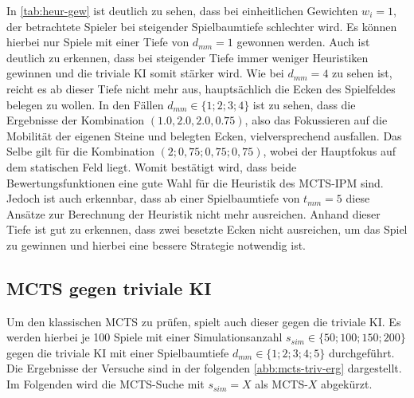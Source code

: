 \documentclass[12pt,a4paper,bibliography=totocnumbered,listof=totocnumbered]{article}
\begin{document}
In \autoref{tab:heur-gew} ist deutlich zu sehen, dass bei einheitlichen Gewichten $w_i=1$, der betrachtete Spieler bei steigender Spielbaumtiefe schlechter wird. Es können hierbei nur Spiele mit einer Tiefe von $d_{mm}=1$ gewonnen werden. Auch ist deutlich zu erkennen, dass bei steigender Tiefe immer weniger Heuristiken gewinnen und die triviale KI somit stärker wird. Wie bei $d_{mm}=4$ zu sehen ist, reicht es ab dieser Tiefe nicht mehr aus, hauptsächlich die Ecken des Spielfeldes belegen zu wollen. In den Fällen $d_{mm} \in \{1;2;3;4\}$ ist zu sehen, dass die Ergebnisse der Kombination $(1.0, 2.0, 2.0, 0.75)$, also das Fokussieren auf die Mobilität der eigenen Steine und belegten Ecken, vielversprechend ausfallen. Das Selbe gilt für die Kombination $(2; 0,75; 0,75; 0,75)$, wobei der Hauptfokus auf dem statischen Feld liegt. Womit bestätigt wird, dass beide Bewertungsfunktionen eine gute Wahl für die Heuristik des MCTS-IPM sind. Jedoch ist auch erkennbar, dass ab einer Spielbaumtiefe von $t_{mm}=5$ diese Ansätze zur Berechnung der Heuristik nicht mehr ausreichen. Anhand dieser Tiefe ist gut zu erkennen, dass zwei besetzte Ecken nicht ausreichen, um das Spiel zu gewinnen und hierbei eine bessere Strategie notwendig ist. 
\subsection{MCTS gegen triviale KI}
Um den klassischen MCTS zu prüfen, spielt auch dieser gegen die triviale KI. Es werden hierbei je 100 Spiele mit einer Simulationsanzahl $s_{sim} \in \{50; 100; 150; 200\}$ gegen die triviale KI mit einer  Spielbaumtiefe $d_{mm} \in \{1;2;3;4;5\}$ durchgeführt. Die Ergebnisse der Versuche sind in der folgenden \autoref{abb:mcts-triv-erg} dargestellt. Im Folgenden wird die MCTS-Suche mit $s_{sim}=X$ als MCTS-$X$ abgekürzt. 
\end{document}

